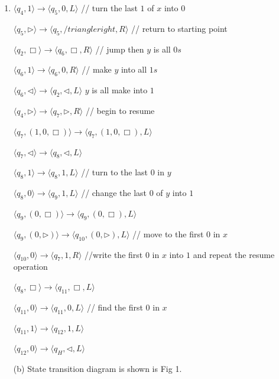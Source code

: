 \documentclass[12pt,a4paper]{article}
\makeatletter
\newtheorem*{solution}{Solution}
\theoremstyle{definition}
\renewenvironment{solution}[1][Solution] {\par\pushQED{\qed}\normalfont\topsep6\p@\@plus6\p@\relax\trivlist\item[\hskip\labelsep\bfseries#1\@addpunct{.}]\ignorespaces}{\popQED\endtrivlist\@endpefalse} \makeatother
\makeatother
\begin{document}
\begin{enumerate}
\begin{solution}
$\langle q_4, 1 \rangle \rightarrow \langle q_5, 0,   L\rangle$ // turn the last $1$ of $x$ into $0$ 

$\langle q_5, \triangleright \rangle \rightarrow \langle q_5, /triangleright,   R\rangle$ // return to starting point

$\langle q_2, \Box \rangle \rightarrow \langle q_6, \Box,   R\rangle$ // jump then $y$ is all $0s$

$\langle q_6, 1 \rangle \rightarrow \langle q_6, 0,   R\rangle$ // make $y$ into all $1s$

$\langle q_6, \triangleleft \rangle \rightarrow \langle q_2, \triangleleft,   L\rangle$ $y$ is all make into $1$ 

$\langle q_4, \triangleright \rangle \rightarrow \langle q_7, \triangleright,   R\rangle$ // begin to resume

$\langle q_7, (1, 0, \Box) \rangle \rightarrow \langle q_7, (1, 0, \Box),   L\rangle$ 

$\langle q_7, \triangleleft \rangle \rightarrow \langle q_8, \triangleleft,   L\rangle$ 

$\langle q_8, 1 \rangle \rightarrow \langle q_8, 1,   L\rangle$ // turn to the last $0$ in $y$

$\langle q_8, 0 \rangle \rightarrow \langle q_9, 1,   L\rangle$ // change the last $0$ of $y$ into $1$

$\langle q_9, (0, \Box) \rangle \rightarrow \langle q_9, (0, \Box),   L\rangle$

$\langle q_9, (0, \triangleright) \rangle \rightarrow \langle q_{10}, (0, \triangleright),   L\rangle$ // move to the first $0$ in $x$

$\langle q_{10}, 0 \rangle \rightarrow \langle q_7, 1,   R\rangle$ //write the first $0$ in $x$ into $1$ and repeat the resume operation

$\langle q_8, \Box \rangle \rightarrow \langle q_{11}, \Box,   L\rangle$

$\langle q_{11}, 0 \rangle \rightarrow \langle q_{11}, 0,   L\rangle$  // find the first $0$ in $x$

$\langle q_{11}, 1 \rangle \rightarrow \langle q_{12}, 1,   L\rangle$ 

$\langle q_{12}, 0 \rangle \rightarrow \langle q_{H}, \triangleleft,   L\rangle$ 



(b) State transition diagram is shown is Fig 1.



\end{solution}
\end{enumerate}
\end{document}
